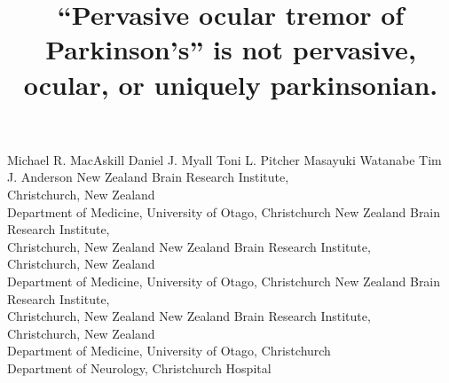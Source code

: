 \documentclass[jou,a4paper]{apa6}
\begin{document}
\newcommand{\jemrVolume}{x}
\newcommand{\jemrIssue}{y}
\newcommand{\jemrArticle}{z}
\newcommand{\jemrLastPage}{\pageref{LastPage}}
\newcommand{\jemrReceivedDate}{Mmm dd, 2016}
\newcommand{\jemrPublishedDate}{Mmm dd, 2016}
\newcommand{\jemrShortTitle}{``Ocular tremor'' in Parkinson's disease}


\title{``Pervasive ocular tremor of Parkinson's'' is not pervasive, ocular, or uniquely parkinsonian.}
\fiveauthors
	{Michael R. MacAskill}
	{Daniel J. Myall}
	{Toni L. Pitcher}
	{Masayuki Watanabe}
	{Tim J. Anderson}
\fiveaffiliations
    {New Zealand Brain Research Institute,\\Christchurch, New Zealand\\
    Department of Medicine, University of Otago, Christchurch}
    {New Zealand Brain Research Institute,\\Christchurch, New Zealand}
    {New Zealand Brain Research Institute,\\Christchurch, New Zealand\\
    Department of Medicine, University of Otago, Christchurch}
	{New Zealand Brain Research Institute,\\Christchurch, New Zealand}
    {New Zealand Brain Research Institute,\\Christchurch, New Zealand\\
    Department of Medicine, University of Otago, Christchurch\\
    Department of Neurology, Christchurch Hospital}
\end{document}
